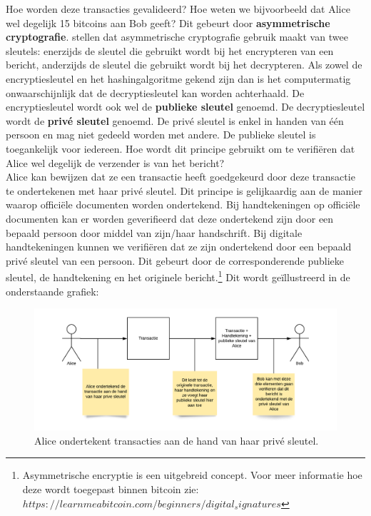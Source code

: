 Hoe worden deze transacties gevalideerd? Hoe weten we bijvoorbeeld dat Alice wel degelijk 15 bitcoins aan Bob geeft? Dit gebeurt door \textbf{asymmetrische cryptografie}. \textcite{Farah2012} stellen dat asymmetrische cryptografie gebruik maakt van twee sleutels: enerzijds de sleutel die gebruikt wordt bij het encrypteren van een bericht, anderzijds de sleutel die gebruikt wordt bij het decrypteren. Als zowel de encryptiesleutel en het hashingalgoritme gekend zijn dan is het computermatig onwaarschijnlijk dat de decryptiesleutel kan worden achterhaald. De encryptiesleutel wordt ook wel de \textbf{publieke sleutel} genoemd. De decryptiesleutel wordt de \textbf{privé sleutel} genoemd. De privé sleutel is enkel in handen van één persoon en mag niet gedeeld worden met andere. De publieke sleutel is toegankelijk voor iedereen. Hoe wordt dit principe gebruikt om te verifiëren dat Alice wel degelijk de verzender is van het bericht?\\

Alice kan bewijzen dat ze een transactie heeft goedgekeurd door deze transactie te ondertekenen met haar privé sleutel. Dit principe is gelijkaardig aan de manier waarop officiële documenten worden ondertekend. Bij handtekeningen op officiële documenten kan er worden geverifieerd dat deze ondertekend zijn door een bepaald persoon door middel van zijn/haar handschrift. Bij digitale handtekeningen kunnen we verifiëren dat ze zijn ondertekend door een bepaald privé sleutel van een persoon. Dit gebeurt door de corresponderende publieke sleutel, de handtekening en het originele bericht.\footnote{Asymmetrische encryptie is een uitgebreid concept. Voor meer informatie hoe deze wordt toegepast binnen bitcoin zie: $https://learnmeabitcoin.com/beginners/digital_signatures$} Dit wordt geïllustreerd in de onderstaande grafiek:

\begin{figure}[h!]
	\centering
		\includegraphics[scale=0.4]{blockchain-2.png}
	\caption[Blockchain - Voorstelling 2]{Alice ondertekent transacties aan de hand van haar privé sleutel.}
\end{figure}

